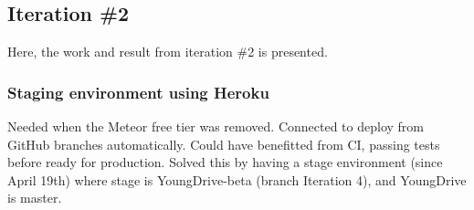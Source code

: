 \subsection{Iteration \#2}
Here, the work and result from iteration \#2 is presented.

\subsubsection{Staging environment using Heroku}
Needed when the Meteor free tier was removed. Connected to deploy from GitHub branches automatically. Could have benefitted from CI, passing tests before ready for production. Solved this by having a stage environment (since April 19th) where stage is YoungDrive-beta (branch Iteration 4), and YoungDrive is master.

